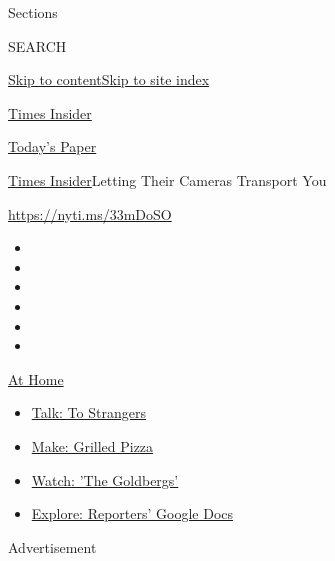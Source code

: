 Sections

SEARCH

\protect\hyperlink{site-content}{Skip to
content}\protect\hyperlink{site-index}{Skip to site index}

\href{https://www.nytimes.com/section/reader-center}{Times Insider}

\href{https://myaccount.nytimes.com/auth/login?response_type=cookie\&client_id=vi}{}

\href{https://www.nytimes.com/section/todayspaper}{Today's Paper}

\href{/section/reader-center}{Times Insider}\textbar{}Letting Their
Cameras Transport You

\url{https://nyti.ms/33mDoSO}

\begin{itemize}
\item
\item
\item
\item
\item
\item
\end{itemize}

\href{https://www.nytimes.com/spotlight/at-home?action=click\&pgtype=Article\&state=default\&region=TOP_BANNER\&context=at_home_menu}{At
Home}

\begin{itemize}
\tightlist
\item
  \href{https://www.nytimes.com/2020/08/03/well/family/the-benefits-of-talking-to-strangers.html?action=click\&pgtype=Article\&state=default\&region=TOP_BANNER\&context=at_home_menu}{Talk:
  To Strangers}
\item
  \href{https://www.nytimes.com/2020/08/01/at-home/coronavirus-make-pizza-on-a-grill.html?action=click\&pgtype=Article\&state=default\&region=TOP_BANNER\&context=at_home_menu}{Make:
  Grilled Pizza}
\item
  \href{https://www.nytimes.com/2020/07/31/arts/television/goldbergs-abc-stream.html?action=click\&pgtype=Article\&state=default\&region=TOP_BANNER\&context=at_home_menu}{Watch:
  'The Goldbergs'}
\item
  \href{https://www.nytimes.com/interactive/2020/at-home/even-more-reporters-editors-diaries-lists-recommendations.html?action=click\&pgtype=Article\&state=default\&region=TOP_BANNER\&context=at_home_menu}{Explore:
  Reporters' Google Docs}
\end{itemize}

Advertisement

